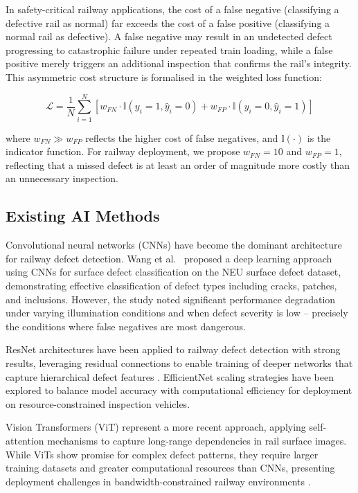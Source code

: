 \documentclass[conference]{IEEE}
\begin{document}
In safety-critical railway applications, the cost of a false negative (classifying a defective rail as normal) far exceeds the cost of a false positive (classifying a normal rail as defective). A false negative may result in an undetected defect progressing to catastrophic failure under repeated train loading, while a false positive merely triggers an additional inspection that confirms the rail's integrity. This asymmetric cost structure is formalised in the weighted loss function:

\begin{equation}
\mathcal{L} = \frac{1}{N} \sum_{i=1}^{N} \left[ w_{FN} \cdot \mathbb{I}(y_i=1, \hat{y}_i=0) + w_{FP} \cdot \mathbb{I}(y_i=0, \hat{y}_i=1) \right]
\end{equation}

where $w_{FN} \gg w_{FP}$ reflects the higher cost of false negatives, and $\mathbb{I}(\cdot)$ is the indicator function. For railway deployment, we propose $w_{FN} = 10$ and $w_{FP} = 1$, reflecting that a missed defect is at least an order of magnitude more costly than an unnecessary inspection.

\subsection{Existing AI Methods}

Convolutional neural networks (CNNs) have become the dominant architecture for railway defect detection. Wang et al.\ \cite{wang2022} proposed a deep learning approach using CNNs for surface defect classification on the NEU surface defect dataset, demonstrating effective classification of defect types including cracks, patches, and inclusions. However, the study noted significant performance degradation under varying illumination conditions and when defect severity is low -- precisely the conditions where false negatives are most dangerous.

ResNet architectures have been applied to railway defect detection with strong results, leveraging residual connections to enable training of deeper networks that capture hierarchical defect features \cite{yolo2024}. EfficientNet scaling strategies have been explored to balance model accuracy with computational efficiency for deployment on resource-constrained inspection vehicles.

Vision Transformers (ViT) represent a more recent approach, applying self-attention mechanisms to capture long-range dependencies in rail surface images. While ViTs show promise for complex defect patterns, they require larger training datasets and greater computational resources than CNNs, presenting deployment challenges in bandwidth-constrained railway environments \cite{alif2026}.
\end{document}
